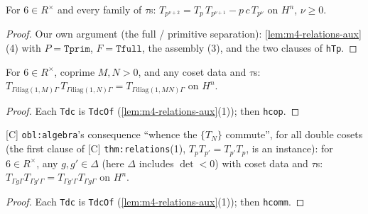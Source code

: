 \begin{theorem}\label{thm:relations-1-model}
  \leanok
  For $6\in R^\times$ and every family of $\tau$s: $T_{p^{\nu+2}}=T_p\,T_{p^{\nu+1}}-p\,c\,T_{p^\nu}$ on $H^n$, $\nu\ge0$.
\end{theorem}
\begin{proof}
  \leanok
  Our own argument (the full / primitive separation): \ref{lem:m4-relations-aux}(4) with $P=\mathtt{Tprim}$,
  $F=\mathtt{Tfull}$, the assembly (3), and the two clauses of \texttt{hTp}.
\end{proof}

\begin{theorem}\label{thm:relations-2-model}
  \leanok
  For $6\in R^\times$, coprime $M,N>0$, and any coset data and $\tau$s:
  $T_{\Gamma\mathrm{diag}(1,M)\Gamma}\,T_{\Gamma\mathrm{diag}(1,N)\Gamma}=T_{\Gamma\mathrm{diag}(1,MN)\Gamma}$ on $H^n$.
\end{theorem}
\begin{proof}
  \leanok
  Each \texttt{Tdc} is \texttt{TdcOf} (\ref{lem:m4-relations-aux}(1)); then \texttt{hcop}.
\end{proof}

\begin{theorem}\label{thm:relations-comm-model}
  \leanok
  [C] \texttt{obl:algebra}'s consequence ``whence the $\{T_N\}$ commute'', for all double cosets (the first clause of [C]
  \texttt{thm:relations}(1), $T_pT_{p'}=T_{p'}T_p$, is an instance): for $6\in R^\times$, any $g,g'\in\Delta$ (here $\Delta$
  includes $\det<0$) with coset data and $\tau$s: $T_{\Gamma g\Gamma}T_{\Gamma g'\Gamma}=T_{\Gamma g'\Gamma}T_{\Gamma g\Gamma}$ on $H^n$.
\end{theorem}
\begin{proof}
  \leanok
  Each \texttt{Tdc} is \texttt{TdcOf} (\ref{lem:m4-relations-aux}(1)); then \texttt{hcomm}.
\end{proof}

